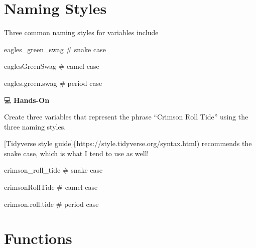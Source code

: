 \documentclass[
  letterpaper,
  DIV=11,
  numbers=noendperiod]{scrreprt}
\newenvironment{Shaded}{\begin{snugshade}}{\end{snugshade}}
\newcommand{\CommentTok}[1]{\textcolor[rgb]{0.37,0.37,0.37}{#1}}
\newcommand{\NormalTok}[1]{\textcolor[rgb]{0.00,0.23,0.31}{#1}}
\begin{document}
\section{Naming Styles}\label{naming-styles}

Three common naming styles for variables include

\begin{Shaded}
\begin{Highlighting}[]
\NormalTok{eagles\_green\_swag    }\CommentTok{\# snake case}

\NormalTok{eaglesGreenSwag      }\CommentTok{\# camel case}

\NormalTok{eagles.green.swag    }\CommentTok{\# period case}
\end{Highlighting}
\end{Shaded}

💻 \textbf{Hands-On}

Create three variables that represent the phrase ``Crimson Roll Tide''
using the three naming styles.

\begin{tcolorbox}[enhanced jigsaw, colbacktitle=quarto-callout-tip-color!10!white, opacitybacktitle=0.6, breakable, left=2mm, leftrule=.75mm, toprule=.15mm, toptitle=1mm, bottomtitle=1mm, colframe=quarto-callout-tip-color-frame, opacityback=0, coltitle=black, arc=.35mm, titlerule=0mm, colback=white, bottomrule=.15mm, title=\textcolor{quarto-callout-tip-color}{\faLightbulb}\hspace{0.5em}{Answer}, rightrule=.15mm]

{[}Tidyverse style guide{]}\{https://style.tidyverse.org/syntax.html)
recommends the snake case, which is what I tend to use as well!

\begin{Shaded}
\begin{Highlighting}[]
\NormalTok{crimson\_roll\_tide    }\CommentTok{\# snake case}

\NormalTok{crimsonRollTide      }\CommentTok{\# camel case}

\NormalTok{crimson.roll.tide    }\CommentTok{\# period case}
\end{Highlighting}
\end{Shaded}

\end{tcolorbox}

\section{\texorpdfstring{\textbf{Functions}}{Functions}}\label{functions}
\end{document}

